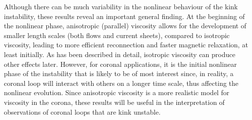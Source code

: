 Although there can be much variability in the nonlinear behaviour of the kink instability, these results reveal an important general finding. At the beginning of the nonlinear phase, anisotropic (parallel) viscosity allows for the development of smaller length scales (both flows and current sheets), compared to isotropic viscosity, leading to more efficient reconnection and faster magnetic relaxation, at least initially. As has been described in detail, isotropic viscosity can produce other effects later. However, for coronal applications, it is the initial nonlinear phase of the instability that is likely to be of most interest since, in reality, a coronal loop will interact with others on a longer time scale, thus affecting the nonlinear evolution. Since anisotropic viscosity is a more realistic model for viscosity in the corona, these results will be useful in the interpretation of observations of coronal loops that are kink unstable.
